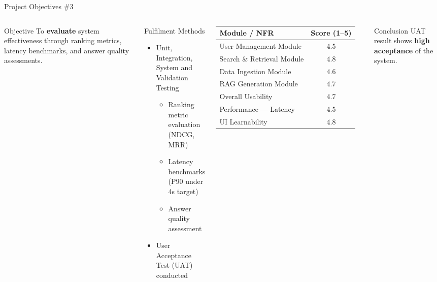 \documentclass[aspectratio=169,xcolor=dvipsnames]{beamer}
\begin{document}
\begin{frame}{Project Objectives \#3}
  \begin{columns}[t]
    \begin{block}{Objective}
      To \textbf{evaluate} system effectiveness through ranking metrics,
      latency benchmarks, and answer quality assessments.
    \end{block}
    \vspace{.4em}
    \begin{block}{Fulfilment Methods}
      \begin{itemize}
        \item Unit, Integration, System and Validation Testing
        \begin{itemize}\scriptsize
          \item Ranking metric evaluation (NDCG, MRR)
          \item Latency benchmarks (P90 under 4s target)
          \item Answer quality assessment
        \end{itemize}
        \item User Acceptance Test (UAT) conducted
      \end{itemize}
    \end{block}
    \scriptsize
    \begin{table}
      \renewcommand{\arraystretch}{1.1}
      \begin{tabular}{p{.60\linewidth}|c}
        \toprule
        \textbf{Module / NFR} & \textbf{Score (1--5)} \\
        \midrule
        User Management Module    & 4.5 \\
        Search \& Retrieval Module & 4.8 \\
        Data Ingestion Module     & 4.6 \\
        RAG Generation Module     & 4.7 \\
        \midrule
        Overall Usability         & 4.7 \\
        Performance — Latency     & 4.5 \\
        UI Learnability           & 4.8 \\
        \bottomrule
      \end{tabular}
    \end{table}
    \vspace{.3em}
    \begin{exampleblock}{Conclusion}
      \small UAT result shows \textbf{high acceptance} of the system.
    \end{exampleblock}
  \end{columns}
\end{frame}
\end{document}
